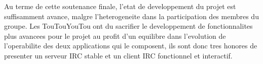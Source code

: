 Au terme de cette soutenance finale, l'etat de developpement du projet est suffisamment avance, malgre l'heterogeneite dans la participation des membres du groupe. Les TouTouYouTou ont du sacrifier le developpement de fonctionnalites plus avancees pour le projet au profit d'un equilibre dans l'evolution de l'operabilite des deux applications qui le composent, ils sont donc tres honores de presenter un serveur IRC stable et un client IRC fonctionnel et interactif.